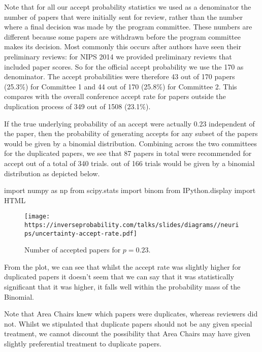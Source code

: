 \documentclass[a4paperpaper,]{article}
\newenvironment{Shaded}{}{}
\newcommand{\ImportTok}[1]{#1}
\newcommand{\NormalTok}[1]{#1}
\begin{document}
Note that for all our accept probability statistics we used as a
denominator the number of papers that were initially sent for review,
rather than the number where a final decision was made by the program
committee. These numbers are different because some papers are withdrawn
before the program committee makes its decision. Most commonly this
occurs after authors have seen their preliminary reviews: for NIPS 2014
we provided preliminary reviews that included paper scores. So for the
official accept probability we use the 170 as denominator. The accept
probabilities were therefore 43 out of 170 papers (25.3\%) for Committee
1 and 44 out of 170 (25.8\%) for Committee 2. This compares with the
overall conference accept rate for papers outside the duplication
process of 349 out of 1508 (23.1\%).

If the true underlying probability of an accept were actually 0.23
independent of the paper, then the probability of generating accepts for
any subset of the papers would be given by a binomial distribution.
Combining across the two committees for the duplicated papers, we see
that 87 papers in total were recommended for accept out of a total of
340 trials. out of 166 trials would be given by a binomial distribution
as depicted below.

\begin{Shaded}
\begin{Highlighting}[]
\ImportTok{import}\NormalTok{ numpy }\ImportTok{as}\NormalTok{ np}
\ImportTok{from}\NormalTok{ scipy.stats }\ImportTok{import}\NormalTok{ binom}
\ImportTok{from}\NormalTok{ IPython.display }\ImportTok{import}\NormalTok{ HTML}
\end{Highlighting}
\end{Shaded}

\begin{figure}[htb]
\texttt{[image: https://inverseprobability.com/talks/slides/diagrams//neurips/uncertainty-accept-rate.pdf]}


\caption{Number of accepted papers for $p=0.23$.}
\label{uncertainty-accept-rate}
\end{figure}

From the plot, we can see that whilst the accept rate was slightly
higher for duplicated papers it doesn't seem that we can say that it was
statistically significant that it was higher, it falls well within the
probability mass of the Binomial.

Note that Area Chairs knew which papers were duplicates, whereas
reviewers did not. Whilst we stipulated that duplicate papers should not
be any given special treatment, we cannot discount the possibility that
Area Chairs may have given slightly preferential treatment to duplicate
papers.
\end{document}
